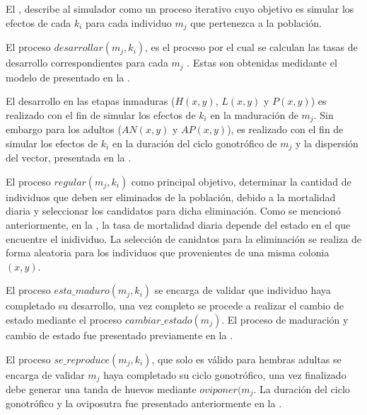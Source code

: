 El , describe al simulador como un proceso iterativo cuyo objetivo
es simular los efectos de cada $k_{i}$ para cada individuo $m_{j}$ que pertenezca a la población.

El proceso $desarrollar(m_{j}, k_{i})$, es el proceso por el cual se calculan las tasas de
desarrollo correspondientes para cada $m_{j}$ . Estas son obtenidas medidante el modelo de
\cite{sharpe1977reaction} presentado en la .

El desarrollo en las etapas inmaduras ($H(x,y)$, $L(x,y)$ y $P(x,y)$) es realizado con el fin de
simular los efectos de $k_{i}$ en la maduración de $m_{j}$. Sin embargo para los adultos ($AN(x,y)$
y $AP(x,y)$), es realizado con el fin de simular los efectos de $k_{i}$ en la duración del ciclo
gonotrófico de $m_{j}$ y la dispersión del vector, presentada en la
.

El proceso $regular(m_{j}, k_{i})$ como principal objetivo, determinar la cantidad de individuos
que deben ser eliminados de la población, debido a la mortalidad diaria y seleccionar los
candidatos para dicha eliminación. Como se mencionó anteriormente, en la
, la tasa de mortalidad diaria depende del estado en el que
encuentre el inidividuo. La selección de canidatos para la eliminación se realiza de forma
aleatoria para los individuos que provenientes de una misma colonia $(x, y)$.

El proceso $esta\_maduro(m_{j}, k_{i})$ se encarga de validar que individuo haya completado su
desarrollo, una vez completo se procede a realizar el cambio de estado mediante el proceso
$cambiar\_estado(m_{j})$. El proceso de maduración y cambio de estado fue presentado previamente
en la .

El proceso $se\_reproduce(m_{j}, k_{i})$, que solo es válido para hembras adultas se encarga de
validar $m_{j}$ haya completado su ciclo gonotrófico, una vez finalizado debe generar una tanda de
huevos mediante $oviponer(m_{j}$. La duración del ciclo gonotrófico y la oviposutra fue presentado
anteriormente en la .
